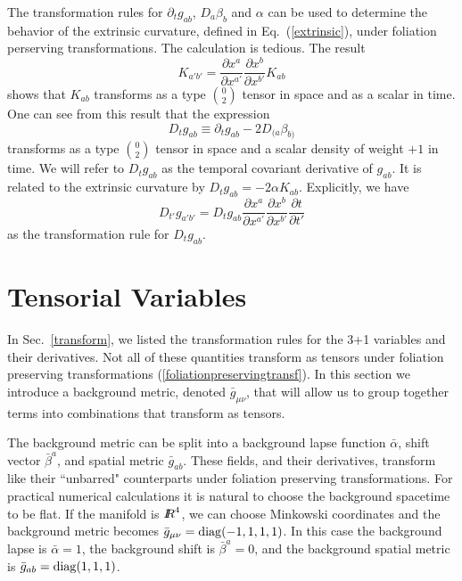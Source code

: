 \documentclass[letterpaper,nofootinbib,prd,amsmath,onecolumn]{revtex4-1}
\newcommand{\RR}{\hbox{$I$\kern-3.8pt $R$}}
\begin{document}
The transformation rules for $\partial_t g_{ab}$, $D_a\beta_b$ and $\alpha$ can be used to determine the behavior of the extrinsic curvature, 
defined in Eq.~(\ref{extrinsic}), under foliation perserving transformations. The calculation is tedious. The result
\begin{equation}
K_{a'b'} = \frac{\partial x^{a}}{\partial x^{a'}}\frac{\partial x^{b}}{\partial x^{b'}} K_{ab}
\end{equation}
shows that $K_{ab}$ transforms as a type $0 \choose 2$ tensor in space and as a scalar in 
time. One can see from this result that the expression 
\begin{equation}
D_{t}g_{ab} \equiv \partial_{t}g_{ab} - 2D_{(a}\beta_{b)}
\end{equation}
transforms as a type $0 \choose 2$ tensor in space and a scalar density of weight $+1$ in time. 
We will refer to $D_t g_{ab}$ as the temporal covariant derivative of $g_{ab}$. It is related to the 
extrinsic curvature by $D_t g_{ab} = -2\alpha K_{ab}$.  Explicitly, we have 
\begin{equation}
D_{t'}g_{a'b'} = D_{t}g_{ab}\frac{\partial x^{a}}{\partial x^{a'}}\frac{\partial x^{b}}{\partial x^{b'}}\frac{\partial t}{\partial t'}
\end{equation}
as the transformation rule for $D_t g_{ab}$. 

\section{Tensorial Variables}\label{tensorial}
In Sec.~\ref{transform}, we listed the transformation rules for the 3+1 variables and their derivatives. Not all of these quantities transform 
as tensors under foliation  preserving transformations (\ref{foliationpreservingtransf}).
In this section we introduce a background metric, denoted ${\bar g}_{\mu\nu}$, that will allow us to group together terms into combinations 
that transform as tensors. 

The background metric can be split into a background lapse function $\bar \alpha$, shift vector $\bar\beta^a$, and 
spatial metric $\bar g_{ab}$. These fields, and their derivatives, transform like their ``unbarred" counterparts under foliation preserving 
transformations. For practical numerical calculations it is natural to choose the background spacetime to be flat. If the manifold is 
$\RR^4$, we can choose Minkowski coordinates and the background metric becomes $\bar g_{\mu\nu} = {\rm diag}(-1,1,1,1)$. In this case 
the background lapse is $\bar\alpha = 1$, the background shift is $\bar\beta^a = 0$, and the background spatial metric is 
$\bar g_{ab} = {\rm diag}(1,1,1)$. 
\end{document}
